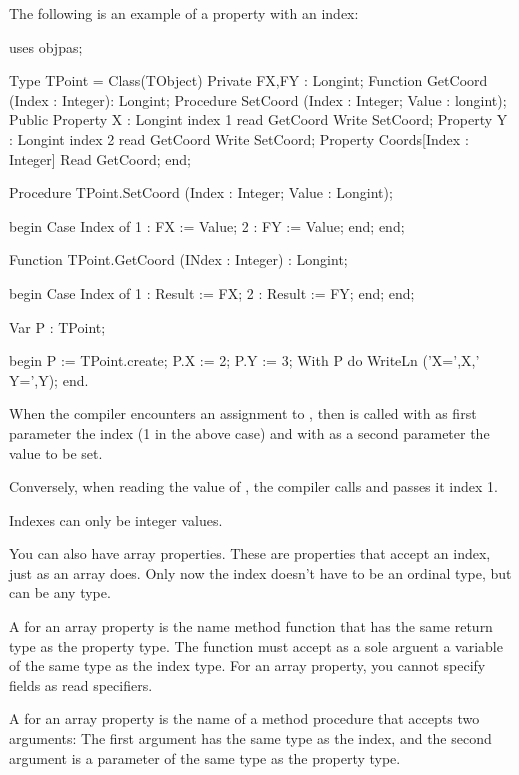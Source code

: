 \documentclass{report}
\begin{document}
The following is an example of a property with an index:
\begin{listing}

uses objpas;

Type TPoint = Class(TObject)
       Private
       FX,FY : Longint;
       Function GetCoord (Index : Integer): Longint;
       Procedure SetCoord (Index : Integer; Value : longint); 
       Public
       Property X : Longint index 1 read GetCoord Write SetCoord;
       Property Y : Longint index 2 read GetCoord Write SetCoord;
       Property Coords[Index : Integer] Read GetCoord;
       end;

Procedure TPoint.SetCoord (Index : Integer; Value : Longint);

begin
  Case Index of
   1 : FX := Value;
   2 : FY := Value;
  end;
end;

Function TPoint.GetCoord (INdex : Integer) : Longint;

begin
  Case Index of
   1 : Result := FX;
   2 : Result := FY;
  end;
end;

Var P : TPoint;

begin
  P := TPoint.create;
  P.X := 2;
  P.Y := 3;
  With P do
    WriteLn ('X=',X,' Y=',Y);
end.
\end{listing}
When the compiler encounters an assignment to , then  
is called with as first parameter the index (1 in the above case) and with
as a second parameter the value to be set.

Conversely, when reading the value of , the compiler calls
 and passes it index 1. 

Indexes can only be integer values.

You can also have array properties. These are properties that accept an
index, just as an array does. Only now the index doesn't have to be an 
ordinal type, but can be any type.

A  for an array property is the name method function 
that has the same return type as  the property type. 
The function must accept as a sole arguent a variable of the same type as 
the index type. For an array property, you cannot specify fields as read 
specifiers. 

A  for an array property is the name of a method 
procedure that accepts two arguments: The first argument has the same 
type as the index, and the second argument is a parameter of the same 
type as the property type.
\end{document}
